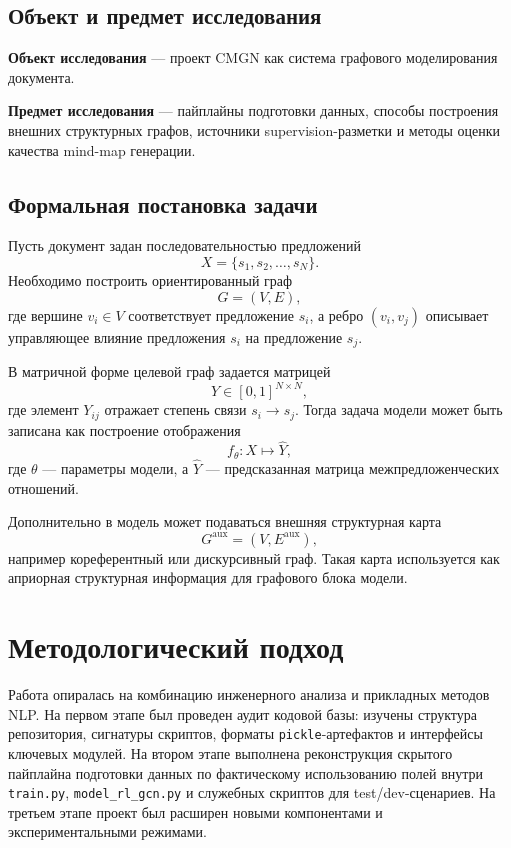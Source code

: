 \documentclass[12pt,a4paper]{article}
\begin{document}
\subsection{Объект и предмет исследования}

\textbf{Объект исследования} --- проект CMGN как система графового моделирования документа.

\textbf{Предмет исследования} --- пайплайны подготовки данных, способы построения внешних структурных графов, источники supervision-разметки и методы оценки качества mind-map генерации.

\subsection{Формальная постановка задачи}

Пусть документ задан последовательностью предложений
\[
X = \{s_1, s_2, \dots, s_N\}.
\]
Необходимо построить ориентированный граф
\[
G = (V, E),
\]
где вершине $v_i \in V$ соответствует предложение $s_i$, а ребро $(v_i, v_j)$ описывает управляющее влияние предложения $s_i$ на предложение $s_j$.

В матричной форме целевой граф задается матрицей
\[
Y \in [0,1]^{N \times N},
\]
где элемент $Y_{ij}$ отражает степень связи $s_i \rightarrow s_j$. Тогда задача модели может быть записана как построение отображения
\[
f_{\theta}: X \mapsto \hat{Y},
\]
где $\theta$ --- параметры модели, а $\hat{Y}$ --- предсказанная матрица межпредложенческих отношений.

Дополнительно в модель может подаваться внешняя структурная карта
\[
G^{\text{aux}} = (V, E^{\text{aux}}),
\]
например кореферентный или дискурсивный граф. Такая карта используется как априорная структурная информация для графового блока модели.

\section{Методологический подход}

Работа опиралась на комбинацию инженерного анализа и прикладных методов NLP. На первом этапе был проведен аудит кодовой базы: изучены структура репозитория, сигнатуры скриптов, форматы \texttt{pickle}-артефактов и интерфейсы ключевых модулей. На втором этапе выполнена реконструкция скрытого пайплайна подготовки данных по фактическому использованию полей внутри \texttt{train.py}, \texttt{model\_rl\_gcn.py} и служебных скриптов для test/dev-сценариев. На третьем этапе проект был расширен новыми компонентами и экспериментальными режимами.
\end{document}
